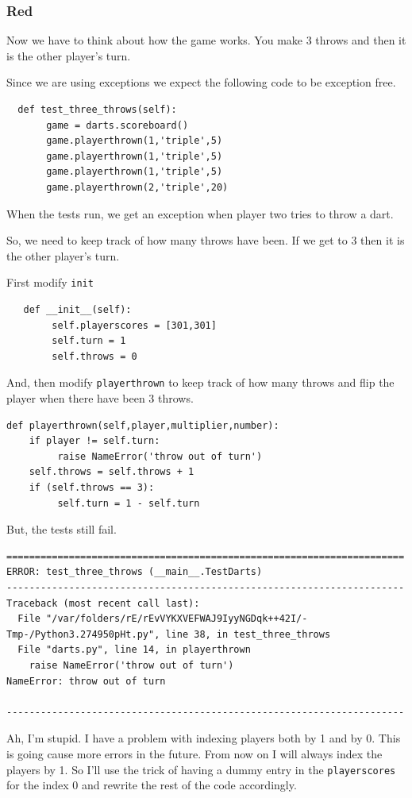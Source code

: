 \documentclass{beamer}
\begin{document}
\begin{frame}[fragile]
\frametitle{Red}
 Now we have to think about how the game works. 
 You make 3 throws and then it is the other player's turn.

 Since we are using exceptions we expect the following code to be
 exception free.

\begin{lstlisting}
  def test_three_throws(self):
       game = darts.scoreboard()
       game.playerthrown(1,'triple',5)
       game.playerthrown(1,'triple',5)
       game.playerthrown(1,'triple',5)
       game.playerthrown(2,'triple',20)
\end{lstlisting}
When the tests run, we get an exception when player two tries to throw
a dart.  
\end{frame}
\begin{frame}[fragile]
So, we need to keep track of how many throws have been. If we get to 3
then it is the other player's turn.

First modify {\tt init}
\begin{lstlisting}
   def __init__(self):
        self.playerscores = [301,301]
        self.turn = 1
        self.throws = 0
\end{lstlisting}
And, then  modify {\tt playerthrown} to keep track of how many throws and flip the
player when there have been 3 throws.
\begin{lstlisting}
def playerthrown(self,player,multiplier,number):
    if player != self.turn:
         raise NameError('throw out of turn')
    self.throws = self.throws + 1
    if (self.throws == 3):
         self.turn = 1 - self.turn
\end{lstlisting}
  
\end{frame}
\begin{frame}[fragile]
But, the tests still fail.
\begin{verbatim}
======================================================================
ERROR: test_three_throws (__main__.TestDarts)
----------------------------------------------------------------------
Traceback (most recent call last):
  File "/var/folders/rE/rEvVYKXVEFWAJ9IyyNGDqk++42I/-Tmp-/Python3.274950pHt.py", line 38, in test_three_throws
  File "darts.py", line 14, in playerthrown
    raise NameError('throw out of turn')
NameError: throw out of turn

----------------------------------------------------------------------
\end{verbatim}
Ah, I'm stupid. I have a problem with indexing players both by 1 and
by 0. This is going cause more errors in the future. From now on I
will always index the players by 1. So I'll use the trick of having a
dummy entry in the {\tt playerscores} for the index 0 and rewrite the rest
of the code accordingly.
\end{frame}
\end{document}
